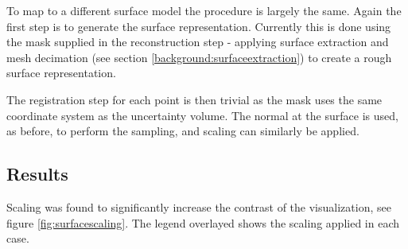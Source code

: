 To map to a different surface model the procedure is largely the same. Again the first step is to generate the surface representation. Currently this is done using the mask supplied in the reconstruction step - applying surface extraction and mesh decimation (see section \ref{background:surfaceextraction}) to create a rough surface representation.

The registration step for each point is then trivial as the mask uses the same coordinate system as the uncertainty volume. The normal at the surface is used, as before, to perform the sampling, and scaling can similarly be applied.

\newpage
\subsection*{Results}
Scaling was found to significantly increase the contrast of the visualization, see figure \ref{fig:surfacescaling}. The legend overlayed shows the scaling applied in each case.

